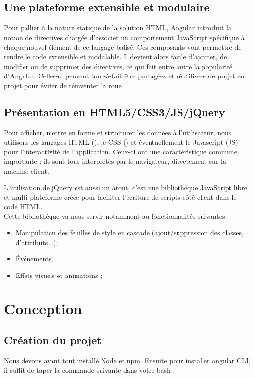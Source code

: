 \subsection{Une plateforme extensible et modulaire}
Pour pallier à la nature statique de la solution HTML, Angular introduit la notion de directives chargée d'associer un comportement JavaScript spécifique à chaque nouvel élément de ce langage balisé. Ces composants vont permettre de rendre le code extensible et modulable. Il devient alors facile d'ajouter, de modifier ou de supprimer des directives, ce qui fait entre autre la popularité d'Angular. Celles-ci peuvent tout-à-fait être partagées et réutilisées de projet en projet pour éviter de réinventer la roue \cite{angular2StepbyStep}.

\subsection{Présentation en HTML5/CSS3/JS/jQuery}
Pour afficher, mettre en forme et structurer les données à l'utilisateur, nous utilisons les langages HTML (), le CSS () et éventuellement le Javascript (JS) pour l'interactivité de l'application. Ceux-ci ont une caractéristique commune importante : ils sont tous interprétés par le navigateur, directement sur la machine client.
\medskip

L'utilisation de jQuery est aussi un atout, c'est une bibliothèque JavaScript libre et multi-plateforme créée pour faciliter l'écriture de scripts côté client dans le code HTML. \\
Cette bibliothèque va nous servir notamment au fonctionnalités suivantes:
\begin{itemize}
	\item [\textbullet] Manipulation des feuilles de style en cascade (ajout/suppression des classes, d'attributs...);
	\item [\textbullet] Événements;
	\item [\textbullet] Effets visuels et animations ;
\end{itemize}

\section{Conception}
\subsection{Création du projet}
Nous devons avant tout installé Node et npm.
Ensuite pour installer angular CLI, il suffit de taper la commande suivante dans votre bash :

